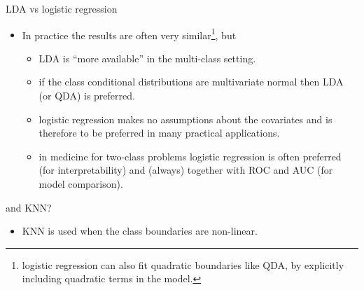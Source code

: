 \documentclass[
  10pt,
  ignorenonframetext,
]{beamer}
\providecommand{\tightlist}{%
  \setlength{\itemsep}{0pt}\setlength{\parskip}{0pt}}
\begin{document}
\begin{frame}
\begin{block}{LDA vs logistic regression}
\protect\hypertarget{lda-vs-logistic-regression}{}
\vspace{2mm}

\begin{itemize}
\tightlist
\item
  In practice the results are often very
  similar\footnote{logistic regression can also fit quadratic boundaries
  like QDA, by explicitly including quadratic terms in the model.},
  but\\
  \vspace{2mm}

  \begin{itemize}
  \tightlist
  \item
    LDA is ``more available'' in the multi-class setting.
  \item
    if the class conditional distributions are multivariate normal then
    LDA (or QDA) is preferred.
  \item
    logistic regression makes no assumptions about the covariates and is
    therefore to be preferred in many practical applications.
  \item
    in medicine for two-class problems logistic regression is often
    preferred (for interpretability) and (always) together with ROC and
    AUC (for model comparison).
  \end{itemize}
\end{itemize}

\vspace{2mm}
\end{block}

\begin{block}{and KNN?}
\protect\hypertarget{and-knn}{}
\vspace{2mm}

\begin{itemize}
\tightlist
\item
  KNN is used when the class boundaries are non-linear.
\end{itemize}
\end{block}
\end{frame}
\end{document}
